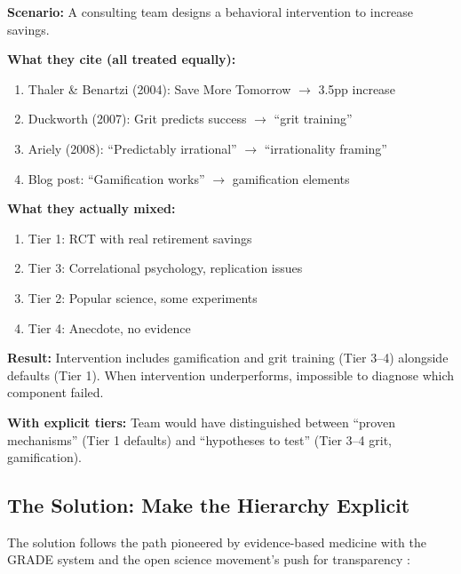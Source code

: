 \documentclass[11pt, a4paper]{article}
\begin{document}
\begin{tcolorbox}[colback=yellow!5!white, colframe=yellow!75!black,
    title=Case Study: A Consulting Project Without Explicit Tiers]

\textbf{Scenario:} A consulting team designs a behavioral intervention to increase savings.

\textbf{What they cite (all treated equally):}
\begin{enumerate}[nosep]
    \item Thaler \& Benartzi (2004): Save More Tomorrow $\to$ 3.5pp increase
    \item Duckworth (2007): Grit predicts success $\to$ ``grit training''
    \item Ariely (2008): ``Predictably irrational'' $\to$ ``irrationality framing''
    \item Blog post: ``Gamification works'' $\to$ gamification elements
\end{enumerate}

\textbf{What they actually mixed:}
\begin{enumerate}[nosep]
    \item Tier 1: RCT with real retirement savings
    \item Tier 3: Correlational psychology, replication issues
    \item Tier 2: Popular science, some experiments
    \item Tier 4: Anecdote, no evidence
\end{enumerate}

\textbf{Result:} Intervention includes gamification and grit training (Tier 3--4) alongside defaults (Tier 1). When intervention underperforms, impossible to diagnose which component failed.

\textbf{With explicit tiers:} Team would have distinguished between ``proven mechanisms'' (Tier 1 defaults) and ``hypotheses to test'' (Tier 3--4 grit, gamification).

\end{tcolorbox}

\subsection{The Solution: Make the Hierarchy Explicit}

The solution follows the path pioneered by evidence-based medicine with the GRADE system \citep{guyatt2008grade} and the open science movement's push for transparency \citep{nosek2015promoting, munafo2017manifesto}:
\end{document}
